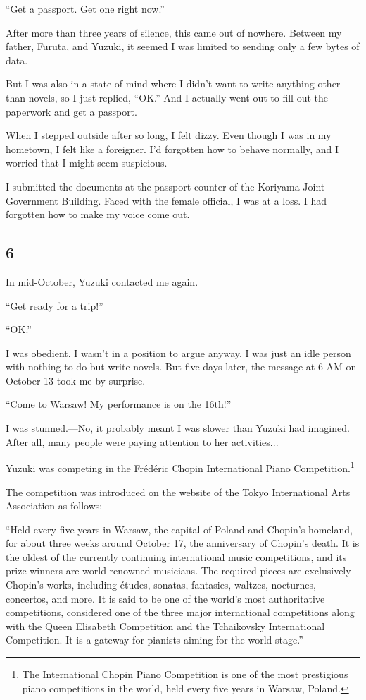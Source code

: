 \documentclass[
    a4paper,
    12pt,
    twoside,
    openany,
    UTF8,
    fontset=windows
]{ctexbook}
\begin{document}
``Get a passport. Get one right now.''

After more than three years of silence, this came out of nowhere. Between my father, Furuta, and Yuzuki, it seemed I was limited to sending only a few bytes of data.

But I was also in a state of mind where I didn't want to write anything other than novels, so I just replied, ``OK.'' And I actually went out to fill out the paperwork and get a passport.

When I stepped outside after so long, I felt dizzy. Even though I was in my hometown, I felt like a foreigner. I'd forgotten how to behave normally, and I worried that I might seem suspicious.

I submitted the documents at the passport counter of the Koriyama Joint Government Building. Faced with the female official, I was at a loss. I had forgotten how to make my voice come out.


\subsection*{6}

In mid-October, Yuzuki contacted me again.

``Get ready for a trip!''

``OK.''

I was obedient. I wasn't in a position to argue anyway. I was just an idle person with nothing to do but write novels. But five days later, the message at 6 AM on October 13 took me by surprise.

``Come to Warsaw! My performance is on the 16th!''

I was stunned.---No, it probably meant I was slower than Yuzuki had imagined. After all, many people were paying attention to her activities...

Yuzuki was competing in the Frédéric Chopin International Piano Competition.\footnote{The International Chopin Piano Competition is one of the most prestigious piano competitions in the world, held every five years in Warsaw, Poland.}

The competition was introduced on the website of the Tokyo International Arts Association as follows:

``Held every five years in Warsaw, the capital of Poland and Chopin's homeland, for about three weeks around October 17, the anniversary of Chopin's death. It is the oldest of the currently continuing international music competitions, and its prize winners are world-renowned musicians. The required pieces are exclusively Chopin's works, including études, sonatas, fantasies, waltzes, nocturnes, concertos, and more. It is said to be one of the world's most authoritative competitions, considered one of the three major international competitions along with the Queen Elisabeth Competition and the Tchaikovsky International Competition. It is a gateway for pianists aiming for the world stage.''
\end{document}
